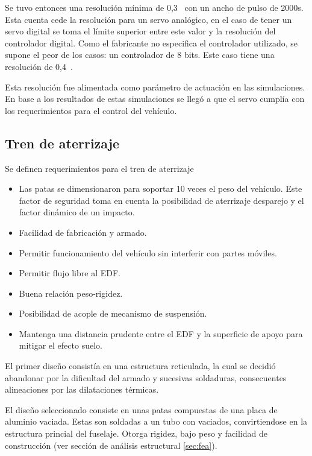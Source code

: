 Se tuvo entonces una resolución mínima de 0,3\grad~ con un ancho de pulso de 2000\micro s. Esta cuenta cede la resolución para un servo analógico, en el caso de tener un servo digital se toma el límite superior entre este valor y la resolución del controlador digital. Como el fabricante no especifica el controlador utilizado, se supone el peor de los casos: un controlador de 8 bits. Este caso tiene una resolución de 0,4\grad~.

Esta resolución fue alimentada como parámetro de actuación en las simulaciones. En base a los resultados de estas simulaciones se llegó a que el servo cumplía con los requerimientos para el control del vehículo. 

\subsection{Tren de aterrizaje}
Se definen requerimientos para el tren de aterrizaje
\begin{itemize}
    \item Las patas se dimensionaron para soportar 10 veces el peso del vehículo. Este factor de seguridad toma en cuenta la posibilidad de aterrizaje desparejo y el factor dinámico de un impacto. %
    \item Facilidad de fabricación y armado.
    \item Permitir funcionamiento del vehículo sin interferir con partes móviles.
    \item Permitir flujo libre al EDF.
    \item Buena relación peso-rigidez.
    \item Posibilidad de acople de mecanismo de suspensión.
    \item Mantenga una distancia prudente entre el EDF y la superficie de apoyo para mitigar el efecto suelo.
\end{itemize}

El primer diseño consistía en una estructura reticulada, la cual se decidió abandonar por la dificultad del armado y sucesivas soldaduras, consecuentes alineaciones por las dilataciones térmicas.

\medskip

El diseño seleccionado consiste en unas patas compuestas de una placa de aluminio vaciada. Estas son soldadas a un tubo con vaciados, convirtiendose en la estructura princial del fuselaje. Otorga rigidez, bajo peso y facilidad de construcción (ver sección de análisis estructural \ref{sec:fea}).

